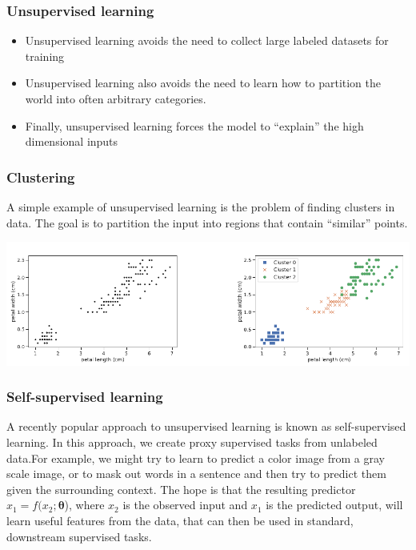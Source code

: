 \documentclass[spanish]{beamer}
\begin{document}
\begin{frame}
\frametitle{Unsupervised learning}
\begin{itemize}
\item Unsupervised learning avoids the need to collect large labeled datasets for training
\item Unsupervised learning also avoids the need to learn how to partition the world into often arbitrary
categories.
\item Finally, unsupervised learning forces the model to “explain” the high dimensional inputs
\end{itemize}

\end{frame}
\begin{frame}
\frametitle{Clustering}
A simple example of unsupervised learning is the problem of finding clusters in data. The goal is to
partition the input into regions that contain “similar” points.
\begin{center}
\includegraphics[scale=0.4]{im15}
\end{center}

\end{frame}
\begin{frame}
\frametitle{Self-supervised learning}

A recently popular approach to unsupervised learning is known as self-supervised learning. In
this approach, we create proxy supervised tasks from unlabeled data.For example, we might try to learn to predict a color image from a gray scale image, or to mask out words in a sentence and then try to predict them given the surrounding context. The hope is that the resulting predictor
$\hat{x}_1=f(x_2;\mathbf{\theta}$), where $x_2$ is the observed input and $x_1$ is the predicted output, will learn useful
features from the data, that can then be used in standard, downstream supervised tasks.

\end{frame}
\end{document}
